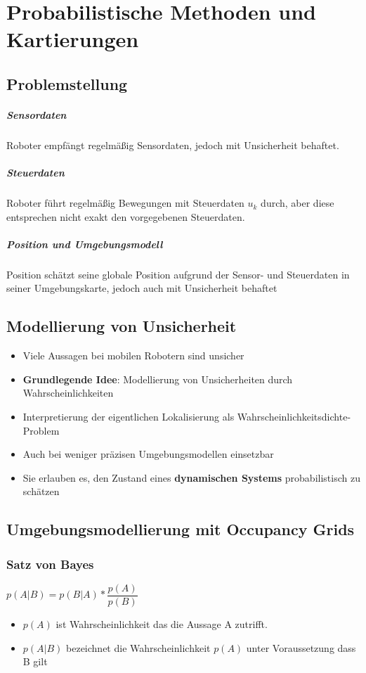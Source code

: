 \chapter{Probabilistische Methoden und Kartierungen}
\section{Problemstellung}
\paragraph{Sensordaten} 
Roboter empfängt regelmäßig Sensordaten, jedoch mit Unsicherheit behaftet.
\paragraph{Steuerdaten}
Roboter führt regelmäßig Bewegungen mit Steuerdaten $u_k$ durch, aber diese entsprechen nicht exakt den vorgegebenen Steuerdaten.
\paragraph{Position und Umgebungsmodell}
Position schätzt seine globale Position aufgrund der Sensor- und Steuerdaten in seiner Umgebungskarte, jedoch auch mit Unsicherheit behaftet
\section{Modellierung von Unsicherheit}
\begin{itemize}
	\item Viele Aussagen bei mobilen Robotern sind unsicher 
	\item \textbf{Grundlegende Idee}: Modellierung von Unsicherheiten durch Wahrscheinlichkeiten
	\item Interpretierung der eigentlichen Lokalisierung als Wahrscheinlichkeitsdichte-Problem
	\item Auch bei weniger präzisen Umgebungsmodellen einsetzbar
	\item Sie erlauben es, den Zustand eines \textbf{dynamischen Systems} probabilistisch zu schätzen
\end{itemize}
\section{Umgebungsmodellierung mit Occupancy Grids}
\subsection{Satz von Bayes}
$p (A|B) = p(B|A) * \dfrac{p(A)}{p(B)}$
\begin{itemize}
	\item $p(A)$ ist Wahrscheinlichkeit das die Aussage A zutrifft.
	\item $p(A|B)$ bezeichnet die Wahrscheinlichkeit $p(A)$ unter Voraussetzung dass B gilt
\end{itemize}
